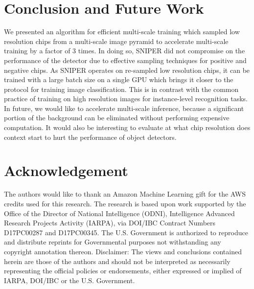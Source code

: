 \documentclass{article}
\begin{document}
\section{Conclusion and Future Work}
We presented an algorithm for efficient multi-scale training which sampled low resolution chips from a multi-scale image pyramid to accelerate multi-scale training by a factor of 3 times. In doing so, SNIPER did not compromise on the performance of the detector due to effective sampling techniques for positive and negative chips. As SNIPER operates on re-sampled low resolution chips, it can be trained with a large batch size on a single GPU which brings it closer to the protocol for training image classification. This is in contrast with the common practice of training on high resolution images for instance-level recognition tasks. In future, we would like to accelerate multi-scale inference, because a significant portion of the background can be eliminated without performing expensive computation. It would also be interesting to evaluate at what chip resolution does context start to hurt the performance of object detectors.

\section{Acknowledgement}
The authors would like to thank an Amazon Machine Learning gift for the AWS credits used for this research. The research is based upon work supported by the Office of the Director of National Intelligence (ODNI), Intelligence Advanced Research Projects Activity (IARPA), via DOI/IBC Contract Numbers D17PC00287 and D17PC00345. The U.S. Government is authorized to reproduce and distribute reprints for Governmental purposes not withstanding any copyright annotation thereon. Disclaimer: The views and conclusions contained herein are those of the authors and should not be interpreted as necessarily representing the official policies or endorsements, either expressed or implied of IARPA, DOI/IBC or the U.S. Government.

\medskip
\small

\end{document}

